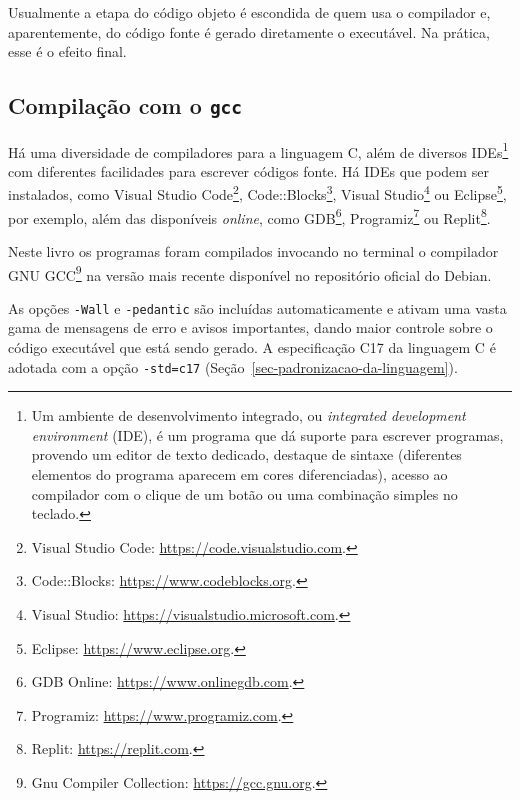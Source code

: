 \documentclass[
  11pt,
  a4paper,
]{scrbook}
\newenvironment{Shaded}{\begin{snugshade}}{\end{snugshade}}
\newcommand{\KeywordTok}[1]{\textcolor[rgb]{0.13,0.29,0.53}{\textbf{#1}}}
\newcommand{\NormalTok}[1]{#1}
\begin{document}
Usualmente a etapa do código objeto é escondida de quem usa o compilador
e, aparentemente, do código fonte é gerado diretamente o executável. Na
prática, esse é o efeito final.

\subsection{\texorpdfstring{Compilação com o
\texttt{gcc}}{Compilação com o gcc}}\label{compilauxe7uxe3o-com-o-gcc}

Há uma diversidade de compiladores para a linguagem C, além de diversos
IDEs\footnote{Um ambiente de desenvolvimento integrado, ou
  \emph{integrated development environment} (IDE), é um programa que dá
  suporte para escrever programas, provendo um editor de texto dedicado,
  destaque de sintaxe (diferentes elementos do programa aparecem em
  cores diferenciadas), acesso ao compilador com o clique de um botão ou
  uma combinação simples no teclado.} com diferentes facilidades para
escrever códigos fonte. Há IDEs que podem ser instalados, como Visual
Studio Code\footnote{Visual Studio Code:
  \url{https://code.visualstudio.com}.}, Code::Blocks\footnote{Code::Blocks:
  \url{https://www.codeblocks.org}.}, Visual Studio\footnote{Visual
  Studio: \url{https://visualstudio.microsoft.com}.} ou
Eclipse\footnote{Eclipse: \url{https://www.eclipse.org}.}, por exemplo,
além das disponíveis \emph{online}, como GDB\footnote{GDB Online:
  \url{https://www.onlinegdb.com}.}, Programiz\footnote{Programiz:
  \url{https://www.programiz.com}.} ou Replit\footnote{Replit:
  \url{https://replit.com}.}.

Neste livro os programas foram compilados invocando no terminal o
compilador GNU GCC\footnote{Gnu Compiler Collection:
  \url{https://gcc.gnu.org}.} na versão mais recente disponível no
repositório oficial do Debian.

\begin{Shaded}
\end{Shaded}

As opções \texttt{-Wall} e \texttt{-pedantic} são incluídas
automaticamente e ativam uma vasta gama de mensagens de erro e avisos
importantes, dando maior controle sobre o código executável que está
sendo gerado. A especificação C17 da linguagem C é adotada com a opção
\texttt{-std=c17} (Seção~\ref{sec-padronizacao-da-linguagem}).
\end{document}

